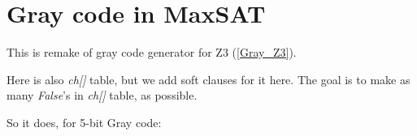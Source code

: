\section{Gray code in MaxSAT}
\label{Gray_MaxSAT}

\renewcommand{\CURPATH}{gray_code/MaxSAT}

This is remake of gray code generator for Z3 (\ref{Gray_Z3}).

Here is also \emph{ch[]} table, but we add soft clauses for it here.
The goal is to make as many \emph{False}'s in \emph{ch[]} table, as possible.



So it does, for 5-bit Gray code:



